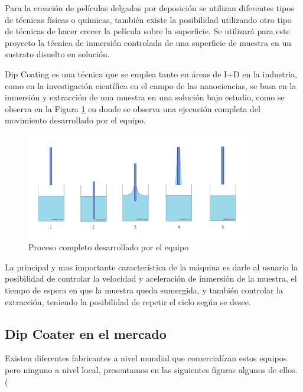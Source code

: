 Para la creación de películas delgadas por deposición se utilizan diferentes tipos de técnicas físicas o químicas, también existe la posibilidad utilizando otro tipo de técnicas de hacer crecer la película sobre la superficie.
Se utilizará para este proyecto la técnica de inmersión controlada de una superficie de muestra en un sustrato disuelto en solución.

Dip Coating es una técnica que se emplea tanto en áreas de I+D en la industria, como en la investigación científica en el campo de las nanociencias, se basa en la inmersión y extracción de una muestra en una solución bajo estudio, como se observa en la Figura \ref{fig:inmersion} en donde se observa una ejecución completa del movimiento desarrollado por el equipo.

\vspace{1cm}
\begin{figure}[htpb]
\centering 
\includegraphics[width=0.9\textwidth]{./Figures/dip-coating.png}
\caption{Proceso completo desarrollado por el equipo}
\label{fig:inmersion}
\end{figure}
\vspace{1cm}
 
La principal y mas importante característica de la máquina es darle al usuario la posibilidad de controlar la velocidad y aceleración de inmersión de la muestra, el tiempo de espera en que la muestra queda sumergida, y también controlar la extracción, teniendo la posibilidad de repetir el ciclo según se desee.
 


\subsection{Dip Coater en el mercado}

Existen diferentes fabricantes a nivel mundial que comercialízan estos equipos pero ninguno a nivel local, presentamos en las siguientes figuras algunos de ellos. (

